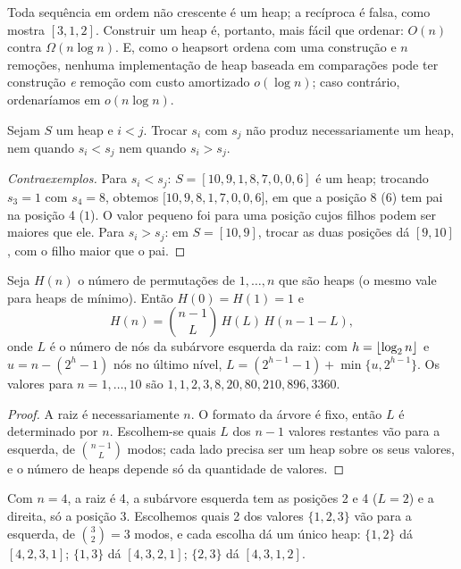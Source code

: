 \begin{prop}
Toda sequência em ordem não crescente é um heap; a recíproca é falsa, como mostra $[3,1,2]$. Construir um heap é, portanto, mais fácil que ordenar: $O(n)$ contra $\Omega(n\log n)$. E, como o heapsort ordena com uma construção e $n$ remoções, nenhuma implementação de heap baseada em comparações pode ter construção \emph{e} remoção com custo amortizado $o(\log n)$; caso contrário, ordenaríamos em $o(n\log n)$.
\end{prop}

\begin{prop}
Sejam $S$ um heap e $i<j$. Trocar $s_i$ com $s_j$ não produz necessariamente um heap, nem quando $s_i<s_j$ nem quando $s_i>s_j$.
\end{prop}
\begin{proof}[Contraexemplos]
Para $s_i<s_j$: $S=[10,9,1,8,7,0,0,6]$ é um heap; trocando $s_3=1$ com $s_4=8$, obtemos $[10,9,8,1,$\allowbreak$7,0,0,6]$, em que a posição 8 ($6$) tem pai na posição 4 ($1$). O valor pequeno foi para uma posição cujos filhos podem ser maiores que ele. Para $s_i>s_j$: em $S=[10,9]$, trocar as duas posições dá $[9,10]$, com o filho maior que o pai.
\end{proof}

\begin{prop}
Seja $H(n)$ o número de permutações de $1,\dots,n$ que são heaps (o mesmo vale para heaps de mínimo). Então $H(0)=H(1)=1$ e
\[
H(n)=\binom{n-1}{L}\,H(L)\,H(n-1-L),
\]
onde $L$ é o número de nós da subárvore esquerda da raiz: com $h=\lfloor\log_2 n\rfloor$ e $u=n-(2^h-1)$ nós no último nível, $L=(2^{h-1}-1)+\min\{u,2^{h-1}\}$. Os valores para $n=1,\dots,10$ são $1,1,2,3,8,20,80,210,896,3360$.
\end{prop}
\begin{proof}
A raiz é necessariamente $n$. O formato da árvore é fixo, então $L$ é determinado por $n$. Escolhem-se quais $L$ dos $n-1$ valores restantes vão para a esquerda, de $\binom{n-1}{L}$ modos; cada lado precisa ser um heap sobre os seus valores, e o número de heaps depende só da quantidade de valores.
\end{proof}

\begin{exemplo}\label{ex:tresheaps}
Com $n=4$, a raiz é 4, a subárvore esquerda tem as posições 2 e 4 ($L=2$) e a direita, só a posição 3. Escolhemos quais 2 dos valores $\{1,2,3\}$ vão para a esquerda, de $\binom32=3$ modos, e cada escolha dá um único heap: $\{1,2\}$ dá $[4,2,3,1]$; $\{1,3\}$ dá $[4,3,2,1]$; $\{2,3\}$ dá $[4,3,1,2]$.
\end{exemplo}

